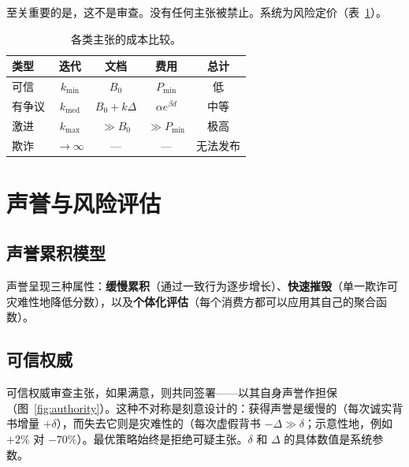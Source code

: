 \documentclass[11pt,a4paper,twocolumn]{article}
\begin{document}
至关重要的是，这不是审查。没有任何主张被禁止。系统为风险定价（表~\ref{tab:costs}）。

\begin{table}[ht]
\centering
\caption{各类主张的成本比较。}
\label{tab:costs}
\footnotesize
\begin{tabular}{@{}lcccc@{}}
\toprule
\textbf{类型} & \textbf{迭代} & \textbf{文档} & \textbf{费用} & \textbf{总计} \\
\midrule
可信 & $k_{\min}$ & $B_0$ & $P_{\min}$ & 低 \\
有争议 & $k_{\text{med}}$ & $B_0{+}k\Delta$ & $\alpha e^{\beta d}$ & 中等 \\
激进 & $k_{\max}$ & $\gg B_0$ & $\gg P_{\min}$ & 极高 \\
欺诈 & $\to\infty$ & --- & --- & 无法发布 \\
\bottomrule
\end{tabular}
\end{table}

\section{声誉与风险评估}

\subsection{声誉累积模型}

声誉呈现三种属性：\textbf{缓慢累积}（通过一致行为逐步增长）、\textbf{快速摧毁}（单一欺诈可灾难性地降低分数），以及\textbf{个体化评估}（每个消费方都可以应用其自己的聚合函数）。

\subsection{可信权威}

可信权威审查主张，如果满意，则共同签署——以其自身声誉作担保（图~\ref{fig:authority}）。这种不对称是刻意设计的：获得声誉是缓慢的（每次诚实背书增量 $+\delta$），而失去它则是灾难性的（每次虚假背书 $-\Delta \gg \delta$；示意性地，例如 $+2\%$ 对 $-70\%$）。最优策略始终是拒绝可疑主张。$\delta$ 和 $\Delta$ 的具体数值是系统参数。
\end{document}
